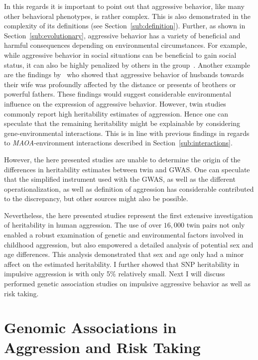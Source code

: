 In this regards it is important to point out that aggressive behavior, like many other behavioral phenotypes, is rather complex.
This is also demonstrated in the complexity of its definitions (see Section~\ref{sub:definition}).
Further, as shown in Section~\ref{sub:evolutionary}, aggressive behavior has a variety of beneficial and harmful consequences depending on environmental circumstances. 
For example, while aggressive behavior in social situations can be beneficial to gain social status, it can also be highly penalized by others in the group~\cite{Buss1997}.
Another example are the findings by~\citet{Figueredo1995} who showed that aggressive behavior of husbands towards their wife was profoundly affected by the distance or presents of brothers or powerful fathers.
These findings would suggest considerable environmental influence on the expression of aggressive behavior.
However, twin studies commonly report high heritability estimates of aggression.
Hence one can speculate that the remaining heritability might be explainable by considering gene-environmental interactions.
This is in line with previous findings in regards to \textit{MAOA}-environment interactions described in Section~\ref{sub:interactions}.

However, the here presented studies are unable to determine the origin of the differences in heritability estimates between twin and GWAS\@.
One can speculate that the simplified instrument used with the GWAS, as well as the different operationalization, as well as definition of aggression has considerable contributed to the discrepancy, but other sources might also be possible.

Nevertheless, the here presented studies represent the first extensive investigation of heritability in human aggression.
The use of over $16,000$ twin pairs not only enabled a robust examination of genetic and environmental factors involved in childhood aggression, but also empowered a detailed analysis of potential sex and age differences.
This analysis demonstrated that sex and age only had a minor affect on the estimated heritability.
I further showed that SNP heritability in impulsive aggression is with only 5\% relatively small.
Next I will discuss performed genetic association studies on impulsive aggressive behavior as well as risk taking. 

\section{Genomic Associations in Aggression and Risk Taking}
\label{sec:genomic_associations_in_aggression_and_risk_taking}

